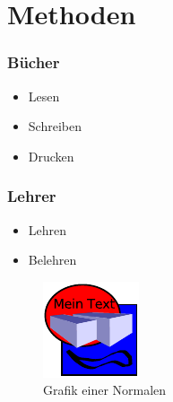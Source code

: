 \section{Methoden}

\begin{frame}
	\frametitle{Bücher}
	\begin{itemize}
		\item Lesen
		\item Schreiben
		\item Drucken
	\end{itemize}
\end{frame}

\begin{frame}
	\frametitle{Lehrer}
	\begin{itemize}
		\item Lehren
		\item Belehren
	\end{itemize}
	\begin{figure}
				\includegraphics[width=0.4\linewidth]{figures/fig}
				\caption{Grafik einer Normalen}
				\label{fig:Normale}
	\end{figure}
\end{frame}
